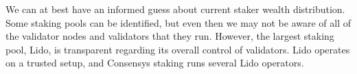 \documentclass[UTF8]{article}
\begin{document}
We can at best have an informed guess about current staker wealth distribution. Some staking pools can be identified, but even then we may not be aware of all of the validator nodes and validators that they run. However, the largest staking pool, Lido, is transparent regarding its overall control of validators. Lido operates on a trusted setup, and Consensys staking runs several Lido operators. 
%
%
%
%
\end{document}
